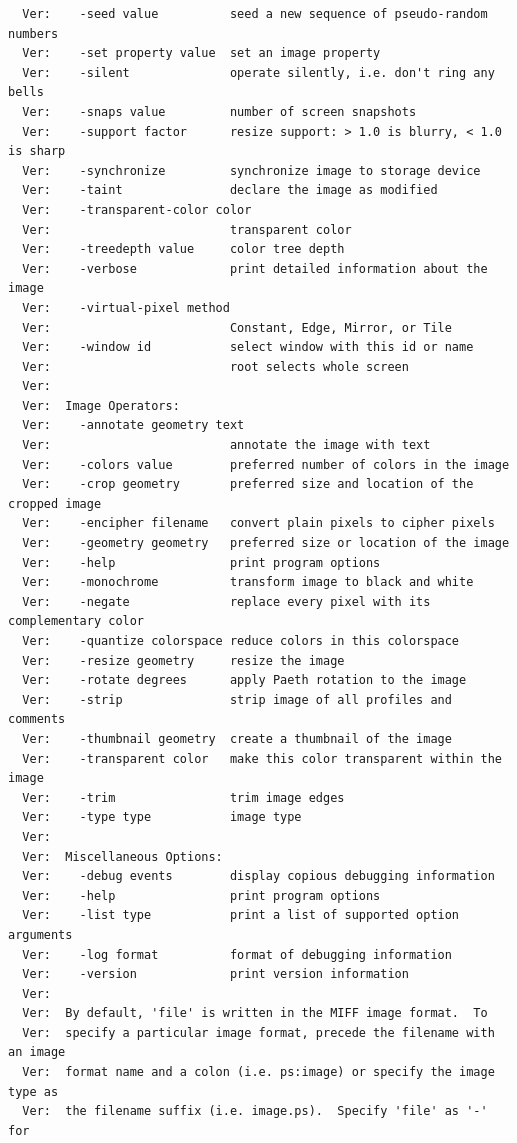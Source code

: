 \documentclass[11pt]{article}
\begin{document}
\begin{verbatim}
  Ver:    -seed value          seed a new sequence of pseudo-random numbers
  Ver:    -set property value  set an image property
  Ver:    -silent              operate silently, i.e. don't ring any bells 
  Ver:    -snaps value         number of screen snapshots
  Ver:    -support factor      resize support: > 1.0 is blurry, < 1.0 is sharp
  Ver:    -synchronize         synchronize image to storage device
  Ver:    -taint               declare the image as modified
  Ver:    -transparent-color color
  Ver:                         transparent color
  Ver:    -treedepth value     color tree depth
  Ver:    -verbose             print detailed information about the image
  Ver:    -virtual-pixel method
  Ver:                         Constant, Edge, Mirror, or Tile
  Ver:    -window id           select window with this id or name
  Ver:                         root selects whole screen
  Ver:  
  Ver:  Image Operators:
  Ver:    -annotate geometry text
  Ver:                         annotate the image with text
  Ver:    -colors value        preferred number of colors in the image
  Ver:    -crop geometry       preferred size and location of the cropped image
  Ver:    -encipher filename   convert plain pixels to cipher pixels
  Ver:    -geometry geometry   preferred size or location of the image
  Ver:    -help                print program options
  Ver:    -monochrome          transform image to black and white
  Ver:    -negate              replace every pixel with its complementary color 
  Ver:    -quantize colorspace reduce colors in this colorspace
  Ver:    -resize geometry     resize the image
  Ver:    -rotate degrees      apply Paeth rotation to the image
  Ver:    -strip               strip image of all profiles and comments
  Ver:    -thumbnail geometry  create a thumbnail of the image
  Ver:    -transparent color   make this color transparent within the image
  Ver:    -trim                trim image edges
  Ver:    -type type           image type
  Ver:  
  Ver:  Miscellaneous Options:
  Ver:    -debug events        display copious debugging information
  Ver:    -help                print program options
  Ver:    -list type           print a list of supported option arguments
  Ver:    -log format          format of debugging information
  Ver:    -version             print version information
  Ver:  
  Ver:  By default, 'file' is written in the MIFF image format.  To
  Ver:  specify a particular image format, precede the filename with an image
  Ver:  format name and a colon (i.e. ps:image) or specify the image type as
  Ver:  the filename suffix (i.e. image.ps).  Specify 'file' as '-' for

\end{verbatim}
\end{document}
